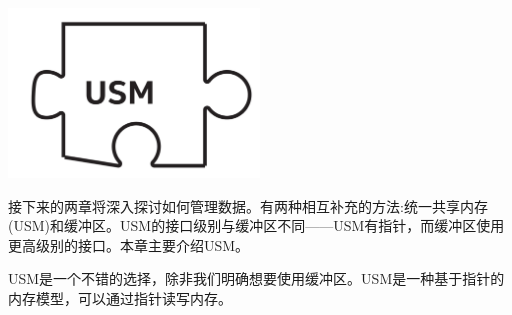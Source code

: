\begin{center}
	\includegraphics[width=0.5\textwidth]{content/chapter-6/images/1}
\end{center}

接下来的两章将深入探讨如何管理数据。有两种相互补充的方法:统一共享内存(USM)和缓冲区。USM的接口级别与缓冲区不同——USM有指针，而缓冲区使用更高级别的接口。本章主要介绍USM。\par

USM是一个不错的选择，除非我们明确想要使用缓冲区。USM是一种基于指针的内存模型，可以通过指针读写内存。\par